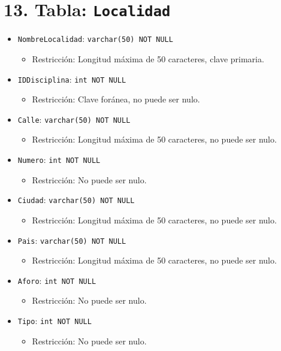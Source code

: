 \section*{13. Tabla: \texttt{Localidad}}
\begin{itemize}
    \item \texttt{NombreLocalidad}: \texttt{varchar(50) NOT NULL}
    \begin{itemize}
        \item Restricción: Longitud máxima de 50 caracteres, clave primaria.
    \end{itemize}
    \item \texttt{IDDisciplina}: \texttt{int NOT NULL}
    \begin{itemize}
        \item Restricción: Clave foránea, no puede ser nulo.
    \end{itemize}
    \item \texttt{Calle}: \texttt{varchar(50) NOT NULL}
    \begin{itemize}
        \item Restricción: Longitud máxima de 50 caracteres, no puede ser nulo.
    \end{itemize}
    \item \texttt{Numero}: \texttt{int NOT NULL}
    \begin{itemize}
        \item Restricción: No puede ser nulo.
    \end{itemize}
    \item \texttt{Ciudad}: \texttt{varchar(50) NOT NULL}
    \begin{itemize}
        \item Restricción: Longitud máxima de 50 caracteres, no puede ser nulo.
    \end{itemize}
    \item \texttt{Pais}: \texttt{varchar(50) NOT NULL}
    \begin{itemize}
        \item Restricción: Longitud máxima de 50 caracteres, no puede ser nulo.
    \end{itemize}
    \item \texttt{Aforo}: \texttt{int NOT NULL}
    \begin{itemize}
        \item Restricción: No puede ser nulo.
    \end{itemize}
    \item \texttt{Tipo}: \texttt{int NOT NULL}
    \begin{itemize}
        \item Restricción: No puede ser nulo.
    \end{itemize}
\end{itemize}

